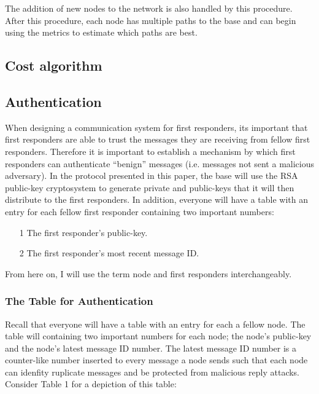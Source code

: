 \documentclass[letterpaper]{article}
\begin{document}
\noindent The addition of new nodes to the network is also handled by this procedure. After this procedure, 
each node has multiple paths to the base and can begin using the metrics to estimate which paths are best.


\subsection{Cost algorithm}

\subsection{Authentication}
When designing a communication system for first responders, its important that first responders are able to trust the messages they are receiving from fellow first responders. Therefore it is important to establish a mechanism by which first responders can authenticate “benign” messages (i.e. messages not sent a malicious adversary). In the protocol presented in this paper, the base will use the RSA public-key cryptosystem to generate private and public-keys that it will then distribute to the first responders. In addition, everyone will have a table with an entry for each fellow first responder containing two important numbers:

\begin{itemize}
\item[1] The first responder's public-key. 
\item[2] The first responder's most recent message ID.
\end{itemize}

From here on, I will use the term node and first responders interchangeably.

\subsubsection{The Table for Authentication}
Recall that everyone will have a table with an entry for each a fellow node. The table will containing two important numbers for each node; the node's public-key and the node's latest message ID number. The latest message ID number is a counter-like number inserted to every message a node sends such that each node can idenfity ruplicate messages and be protected from malicious reply attacks. Consider Table 1 for a depiction of this table:
\end{document}
